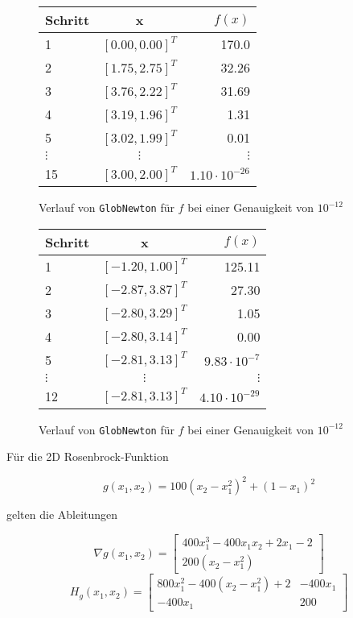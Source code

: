 \documentclass[a4paper, 12pt]{report}
\begin{document}
\begin{figure}[H]
  \centering
  \def\arraystretch{1.25}
  \begin{tabular}{l|c|r}
    \hline
    \textbf{Schritt} & \textbf{x} & \textbf{$f(x)$}\\
    \hline
    1 & $[0.00, 0.00]^T$ & 170.0\\
    2 & $[1.75, 2.75]^T$ & 32.26\\
    3 & $[3.76, 2.22]^T$ & 31.69\\
    4 & $[3.19, 1.96]^T$ & 1.31\\
    5 & $[3.02, 1.99]^T$ & 0.01\\
    $\vdots$ & $\vdots$ & $\vdots$\\
    15 & $[3.00, 2.00]^T$ & $1.10 \cdot 10^{-26}$\\
    \hline
  \end{tabular}
  \caption{Verlauf von \lstinline[basicstyle=\ttfamily\color{black}]|GlobNewton| für $f$ bei einer Genauigkeit von $10^{-12}$}
\end{figure}

\begin{figure}[H]
  \centering
  \def\arraystretch{1.25}
  \begin{tabular}{l|c|r}
    \hline
    \textbf{Schritt} & \textbf{x} & \textbf{$f(x)$}\\
    \hline
    1 & $[-1.20, 1.00]^T$ & 125.11\\
    2 & $[-2.87, 3.87]^T$ & 27.30\\
    3 & $[-2.80, 3.29]^T$ & 1.05\\
    4 & $[-2.80, 3.14]^T$ & 0.00\\
    5 & $[-2.81, 3.13]^T$ & $9.83 \cdot 10^{-7}$\\
    $\vdots$ & $\vdots$ & $\vdots$\\
    12 & $[-2.81, 3.13]^T$ & $4.10 \cdot 10^{-29}$\\
    \hline
  \end{tabular}
  \caption{Verlauf von \lstinline[basicstyle=\ttfamily\color{black}]|GlobNewton| für $f$ bei einer Genauigkeit von $10^{-12}$}
\end{figure}

Für die 2D Rosenbrock-Funktion

$$ g(x_1, x_2) = 100(x_2 - x_1^2)^2 + (1 - x_1)^2 $$

gelten die Ableitungen

$$ \nabla g(x_1, x_2) = \begin{bmatrix} 400x_1^3 - 400x_1x_2 + 2x_1 - 2\\200(x_2 - x_1^2)\end{bmatrix} $$
$$ H_g(x_1, x_2) = \begin{bmatrix} 800x_1^2 - 400(x_2-x_1^2) + 2 & -400x_1\\-400x_1 & 200 \end{bmatrix} $$
\end{document}
